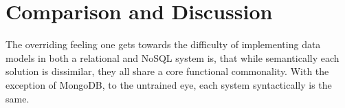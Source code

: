 \chapter{Comparison and Discussion}\label{discussion}
The overriding feeling one gets towards the difficulty of implementing data models in both a relational and NoSQL system is, that while semantically each solution is dissimilar, they all share a core functional commonality. With the exception of MongoDB, to the untrained eye, each system syntactically is the same. 

